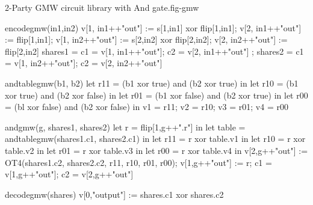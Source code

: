 \begin{fpfig}[t]{2-Party GMW circuit library with And gate.}{fig-gmw}
{\footnotesize
  \begin{verbatimtab}
    encodegmw(in1,in2) {
      v[1, in1++"out"] := s[1,in1] xor flip[1,in1];
      v[2, in1++"out"] := flip[1,in1];
      v[1, in2++"out"] := s[2,in2] xor flip[2,in2];
      v[2, in2++"out"] := flip[2,in2]
      { shares1 = { c1 = v[1, in1++"out"]; c2 = v[2, in1++"out"] };
        shares2 = { c1 = v[1, in2++"out"]; c2 = v[2, in2++"out"]} } 
    }
    
    andtablegmw(b1, b2) {
      let r11 = (b1 xor true) and (b2 xor true) in
      let r10 = (b1 xor true) and (b2 xor false) in
      let r01 = (b1 xor false) and (b2 xor true) in
      let r00 = (bl xor false) and (b2 xor false) in
      { v1 = r11; v2 = r10; v3 = r01; v4 = r00 }
    }
    
    andgmw(g, shares1, shares2) {
      let r = flip[1,g++".r"] in
      let table = andtablegmw(shares1.c1, shares2.c1) in
      let r11 =  r xor table.v1 in
      let r10 =  r xor table.v2 in
      let r01 =  r xor table.v3 in
      let r00 =  r xor table.v4 in
        v[2,g++"out"] := OT4(shares1.c2, shares2.c2, r11, r10, r01, r00);
      v[1,g++"out"] := r;
      { c1 = v[1,g++"out"]; c2 = v[2,g++"out"]}
    }
    
    decodegmw(shares) { v[0,"output"] := shares.c1 xor shares.c2 }   \end{verbatimtab}
}
\end{fpfig}
